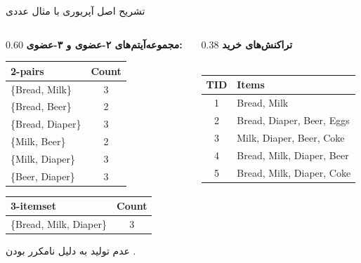 \begin{frame}{تشریح اصل آپریوری با مثال عددی}{}
\begin{columns}[T,onlytextwidth]
\begin{column}{0.60\textwidth}
\vspace{0.15cm}
\textbf{\scriptsize مجموعه‌آیتم‌های ۲-عضوی و ۳-عضوی:}\\[1pt]
\begin{minipage}{0.49\linewidth}
\begin{latin}
\fontsize{6.5}{7.5}\selectfont
\begin{tabular}{|l|c|}
\hline
\rowcolor{mannheimblue!15}\textbf{2-pairs} & \textbf{Count} \\ \hline
\{Bread, Milk\} & 3 \\ \hline
\rowcolor{black!15}\{Bread, Beer\} & 2 \\ \hline
\{Bread, Diaper\} & 3 \\ \hline
\rowcolor{black!15}\{Milk, Beer\} & 2 \\ \hline
\{Milk, Diaper\} & 3 \\ \hline
\{Beer, Diaper\} & 3 \\ \hline
\end{tabular}
\end{latin}
\end{minipage}\hfill
\begin{minipage}{0.49\linewidth}
\begin{latin}
\fontsize{6.5}{7.5}\selectfont
\begin{tabular}{|l|c|}
\hline
\rowcolor{mannheimblue!15}\textbf{3-itemset} & \textbf{Count} \\ \hline
\{Bread, Milk, Diaper\} & 3 \\ \hline
\end{tabular}
\end{latin}
\vspace{0.1cm}
{\scriptsize عدم تولید  به دلیل نامکرر بودن .}
\end{minipage}

\end{column}%
\begin{column}{0.38\textwidth}
\centering
\textbf{\small تراکنش‌های خرید}\\[1pt]
{\scriptsize{}}\\[3pt]
\begin{latin}
\fontsize{7.5}{9.5}\selectfont
\begin{tabular}{|c|l|}
\hline
\rowcolor{mannheimblue!15}
\textbf{TID} & \textbf{Items} \\ \hline
1 & Bread, Milk \\ \hline
2 & Bread, Diaper, Beer, Eggs \\ \hline
3 & Milk, Diaper, Beer, Coke \\ \hline
4 & Bread, Milk, Diaper, Beer \\ \hline
5 & Bread, Milk, Diaper, Coke \\ \hline
\end{tabular}
\end{latin}
\end{column}
\end{columns}
\end{frame}

